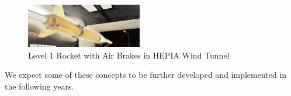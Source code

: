 \documentclass[]{iac}
\begin{document}
  \begin{figure}[h!]
 	\centering
        \includegraphics[width=0.45\textwidth]{img/level1.png}
        \caption{Level 1 Rocket with Air Brakes in HEPIA Wind Tunnel}
        \label{f:level1_airbrake}
 \end{figure}

We expect some of these concepts to be further developed and implemented in the following years.





\end{document}
